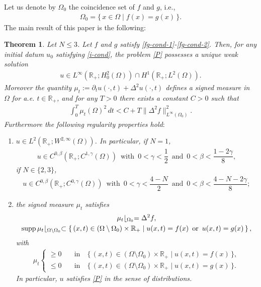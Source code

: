 \documentclass[12pt]{amsart}
\newtheorem{thm}{Theorem}[section]
\begin{document}
Let us denote by $\Omega_0$ the coincidence set of $f$ and $g$, i.e., 
\begin{align} \label{Omega_0}
\Omega_0 = \{\, x \in \Omega \mid f(x)=g(x) \,\}. 
\end{align}
The main result of this paper is the following: 
\begin{thm} \label{main-thm}
Let $N \le 3$. 
Let $f$ and $g$ satisfy \eqref{fg-cond-1}-\eqref{fg-cond-2}. 
Then, for any initial datum $u_0$ satisfying \eqref{i-cond}, the problem \eqref{P} possesses a unique weak solution 
\begin{align}
u \in L^{\infty}({\mathbb{R}}_+ ; H^2_0(\Omega)) \cap H^1({\mathbb{R}}_+ ; L^2(\Omega)).  
\end{align}
Moreover the quantity $\mu_t := {\partial}_t u(\cdot,t) + \Delta^2 u(\cdot, t)$ defines a signed measure in $\Omega$ for 
a.e. $t \in {\mathbb{R}}_+$, and for any $T>0$ there exists a constant $C>0$ such that 
\begin{align}
\int^T_0 \mu_t(\Omega)^2 \, dt < C + T \| \Delta^2 f \|^2_{L^{\infty}(\Omega_0)}. 
\end{align}
Furthermore the following regularity properties hold$\colon$  
\begin{enumerate}
\item[{\rm (i)}] $u \in L^2({\mathbb{R}}_+ ; W^{2, \infty}(\Omega))$. In particular, if $N=1$, 
\begin{align}
u \in C^{0,{\beta}}({\mathbb{R}}_+ ; C^{1, {\gamma}}(\Omega)) \,\,\, \text{with} \,\,\, 0 < {\gamma} < \dfrac{1}{2} \,\,\, \text{and} \,\,\, 
0 < {\beta} < \dfrac{1-2 {\gamma}}{8}, 
\end{align}   
if $N \in  \{ 2, 3 \}$, 
\begin{align}
u \in C^{0,{\beta}}({\mathbb{R}}_+ ; C^{0, {\gamma}}(\Omega)) \,\,\, \text{with} \,\,\, 0 < {\gamma} < \dfrac{4-N}{2} \,\,\, \text{and} \,\,\, 
0 < {\beta} < \dfrac{4-N-2 {\gamma}}{8}; 
\end{align} 
\item[{\rm (ii)}] the signed measure $\mu_t$ satisfies 
\begin{gather}
\mu_t \lfloor_{\Omega_0} = \Delta^2 f,  \label{in-fg-coin} \\
{\rm supp}\, \mu_t \lfloor_{\Omega \setminus \Omega_0} \subset 
\{\, (x,t) \in (\Omega \setminus \Omega_0) \times {\mathbb{R}}_+ \mid u(x,t)= f(x) \,\,\, \text{or} \,\,\, u(x,t)=g(x) \,\}\,, \label{supp-mu_t}
\end{gather}
with
\begin{align}
\mu_t 
\begin{cases}
\ge 0 \quad & \text{in} \quad \{\, (x,t) \in (\Omega \setminus \Omega_0) \times {\mathbb{R}}_+ \mid u(x,t)= f(x) \,\} , \\
\le 0 \quad & \text{in} \quad \{\, (x,t) \in (\Omega \setminus \Omega_0) \times {\mathbb{R}}_+ \mid u(x,t)=g(x) \,\} . 
\end{cases}
\end{align}
In particular, $u$ satisfies \eqref{P} in the sense of distributions. 
\end{enumerate}
\end{thm}
\end{document}

